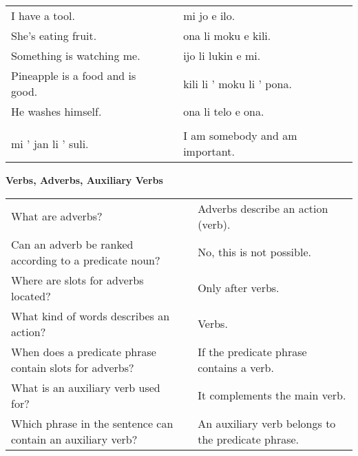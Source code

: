 \begin{supertabular}{p{5,5cm}|ll}
I have a tool. && mi jo e ilo. \\ %
She's eating fruit. && ona li moku e kili. \\ %
Something is watching me. && ijo li lukin e mi. \\ %
Pineapple is a food and is good. && kili li ' moku li ' pona. \\ %
He washes himself. && ona li telo e ona.  \\ %
 && \\ %
mi ' jan li ' suli. && I am somebody and am important. \\
\end{supertabular} 

\textbf{Verbs, Adverbs, Auxiliary Verbs} 
\label{'adverbs'}

\begin{supertabular}{p{5,5cm}|ll}
What are adverbs? && Adverbs describe an action (verb). \\ %
Can an adverb be ranked according to a predicate noun? && No, this is not possible.  \\ %
Where are slots for adverbs located? && Only after verbs. \\ %
What kind of words describes an action? && Verbs. \\ %
When does a predicate phrase contain slots for adverbs? && If the predicate phrase contains a verb. \\ %
What is an auxiliary verb used for?  && It complements the main verb.  \\ %
Which phrase in the sentence can contain an auxiliary verb? && An auxiliary verb belongs to the predicate phrase.  \\ %
\end{supertabular} 

